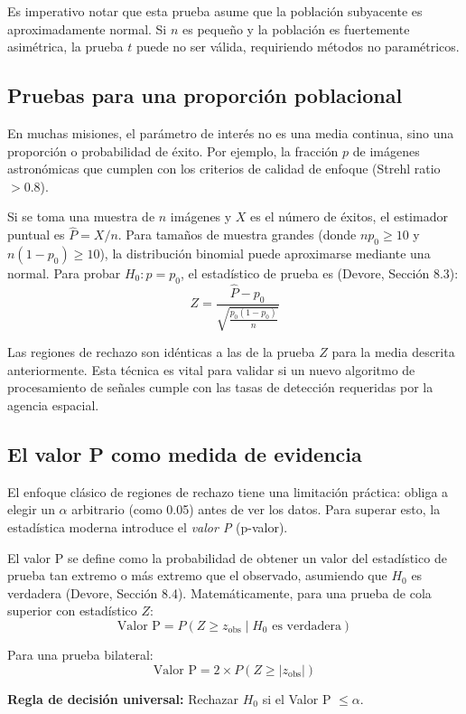 Es imperativo notar que esta prueba asume que la población subyacente es aproximadamente normal. Si $n$ es pequeño y la población es fuertemente asimétrica, la prueba $t$ puede no ser válida, requiriendo métodos no paramétricos.

\subsection{Pruebas para una proporción poblacional}

En muchas misiones, el parámetro de interés no es una media continua, sino una proporción o probabilidad de éxito. Por ejemplo, la fracción $p$ de imágenes astronómicas que cumplen con los criterios de calidad de enfoque (Strehl ratio $> 0.8$). 

Si se toma una muestra de $n$ imágenes y $X$ es el número de éxitos, el estimador puntual es $\hat{P} = X/n$. Para tamaños de muestra grandes (donde $np_0 \ge 10$ y $n(1-p_0) \ge 10$), la distribución binomial puede aproximarse mediante una normal. Para probar $H_0: p = p_0$, el estadístico de prueba es (Devore, Sección 8.3):
$$ Z = \frac{\hat{P} - p_0}{\sqrt{\frac{p_0(1-p_0)}{n}}} $$

Las regiones de rechazo son idénticas a las de la prueba $Z$ para la media descrita anteriormente. Esta técnica es vital para validar si un nuevo algoritmo de procesamiento de señales cumple con las tasas de detección requeridas por la agencia espacial.

\subsection{El valor P como medida de evidencia}

El enfoque clásico de regiones de rechazo tiene una limitación práctica: obliga a elegir un $\alpha$ arbitrario (como 0.05) antes de ver los datos. Para superar esto, la estadística moderna introduce el \textit{valor P} (p-valor). 

El valor P se define como la probabilidad de obtener un valor del estadístico de prueba tan extremo o más extremo que el observado, asumiendo que $H_0$ es verdadera (Devore, Sección 8.4). Matemáticamente, para una prueba de cola superior con estadístico $Z$:
$$ \text{Valor P} = P(Z \ge z_{\text{obs}} \mid H_0 \text{ es verdadera}) $$

Para una prueba bilateral:
$$ \text{Valor P} = 2 \times P(Z \ge |z_{\text{obs}}|) $$

\textbf{Regla de decisión universal:} Rechazar $H_0$ si el Valor P $\le \alpha$.

